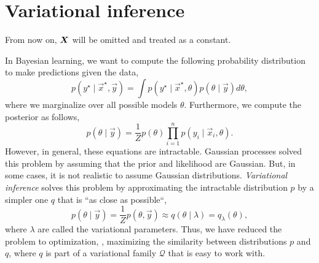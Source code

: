 \section{Variational inference} \label{sec:vi}

\begin{remark}
  From now on, $\bm{X}$ will be omitted and treated as a constant.
\end{remark}

In Bayesian learning, we want to compute the following probability
distribution to make predictions given the data, \[
  p(y^\star \mid \vec{x}^\star, \vec{y})  = \int p(y^\star\mid\vec{x}^\star,\theta)p(\theta\mid\vec{y})d\theta,
\]
where we marginalize over all possible models $\theta$. Furthermore, we
compute the posterior as follows, \[
  p(\theta\mid\vec{y}) = \frac{1}{Z}p(\theta)\prod_{i=1}^n p(y_i\mid \vec{x}_i,\theta).
\]
However, in general, these equations are intractable. Gaussian processes solved this
problem by assuming that the prior and likelihood are
Gaussian. But, in some
cases, it is not realistic to assume Gaussian distributions.
\textit{Variational inference} solves this problem by approximating the
intractable distribution $p$ by a simpler one $q$ that is ``as close as
possible``, \[
  p(\theta\mid\vec{y}) = \frac{1}{Z} p(\theta,\vec{y}) \approx q(\theta\mid\lambda) = q_\lambda (\theta),
\]
where $\lambda$ are called the variational parameters. Thus, we have reduced
the problem to optimization, \ie, maximizing the similarity between
distributions $p$ and $q$, where $q$ is part of a variational family
$\mathcal{Q}$ that is easy to work with.

